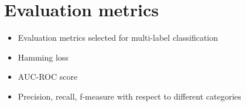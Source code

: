 \section{Evaluation metrics} \cite{tsoumakas2007multi}
    \begin{itemize}
        \item Evaluation metrics selected for multi-label classification 
        \item Hamming loss 
        \item AUC-ROC score 
        \item Precision, recall, f-measure with respect to different categories
    \end{itemize}
    
